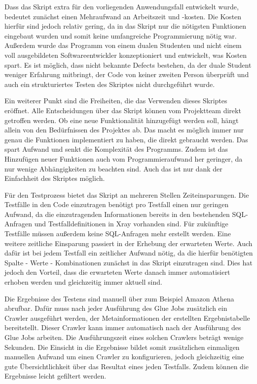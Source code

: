 Dass das Skript extra für den vorliegenden Anwendungsfall entwickelt wurde, bedeutet zunächst einen Mehraufwand an Arbeitszeit und -kosten. Die Kosten hierfür sind jedoch relativ gering, da in das Skript nur die nötigsten Funktionen eingebaut wurden und somit keine umfangreiche Programmierung nötig war. Außerdem wurde das Programm von einem dualen Studenten und nicht einem voll ausgebildeten Softwareentwickler konzeptioniert und entwickelt, was Kosten spart.   
Es ist möglich, dass nicht bekannte Defects bestehen, da der duale Student weniger Erfahrung mitbringt, der Code von keiner zweiten Person überprüft und auch ein strukturiertes Testen des Skriptes nicht durchgeführt wurde. 
\newline


Ein weiterer Punkt sind die Freiheiten, die das Verwenden dieses Skriptes eröffnet. Alle Entscheidungen über das Skript können vom Projektteam direkt getroffen werden. Ob eine neue Funktionalität hinzugefügt werden soll, hängt allein von den  Bedürfnissen des Projektes ab. Das macht es möglich immer nur genau die Funktionen implementiert zu haben, die direkt gebraucht werden. Das spart Aufwand und senkt die Komplexität des Programms. Zudem ist das Hinzufügen neuer Funktionen auch vom Programmieraufwand her geringer, da nur wenige Abhängigkeiten zu beachten sind. Auch das ist nur dank der Einfachheit des Skriptes möglich.
\newline


Für den Testprozess bietet das Skript an mehreren Stellen Zeiteinsparungen. Die Testfälle in den Code einzutragen benötigt pro Testfall einen nur geringen Aufwand, da die einzutragenden Informationen bereits in den bestehenden \ac{SQL}-Anfragen und Testfalldefinitionen in Xray vorhanden sind. Für zukünftige Testfälle müssen außerdem keine \ac{SQL}-Anfragen mehr erstellt werden. 
Eine weitere zeitliche Einsparung passiert in der Erhebung der erwarteten Werte. Auch dafür ist bei jedem Testfall ein zeitlicher Aufwand nötig, da die hierfür benötigten Spalte - Werte - Kombinationen zunächst in das Skript einzutragen sind. Dies hat jedoch den Vorteil, dass die erwarteten Werte danach immer automatisiert erhoben werden und gleichzeitig immer aktuell sind. 
\newline 

Die Ergebnisse des Testens sind manuell über zum Beispiel Amazon Athena abrufbar. Dafür muss nach jeder Ausführung des Glue Jobs zusätzlich ein Crawler ausgeführt werden, der Metainformationen der erstellten Ergebnistabelle bereitstellt. Dieser Crawler kann immer automatisch nach der Ausführung des Glue Jobs arbeiten. Die Ausführungszeit eines solchen Crawlers beträgt wenige Sekunden. Die Einsicht in die Ergebnisse bildet somit zusätzlichen einmaligen manuellen Aufwand um einen Crawler zu konfigurieren, jedoch gleichzeitig eine gute Übersichtlichkeit über das Resultat eines jeden Testfalls. Zudem können die Ergebnisse leicht gefiltert werden.
\newline


